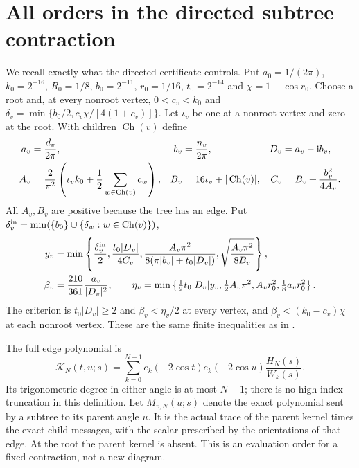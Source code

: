\section{All orders in the directed subtree contraction}\label{me:directed}
We recall exactly what the directed certificate controls. Put
$a_0=1/(2\pi)$, $k_0=2^{-16}$, $R_0=1/8$, $b_0=2^{-11}$,
$r_0=1/16$, $t_0=2^{-14}$ and $\chi=1-\cos r_0$.
Choose a root and, at every nonroot vertex, $0<c_v<k_0$ and
$\delta_v=\min\{b_0/2,c_v\chi/[4(1+c_v)]\}$. Let $\iota_v$ be
one at a nonroot vertex and zero at the root. With children
$\operatorname{Ch}(v)$ define
\begin{align}
 a_v&=\frac{d_v}{2\pi},& b_v&=\frac{n_v}{2\pi},&D_v&=a_v-\mathrm i b_v,
       \notag\\
 A_v&=\frac2{\pi^2}\left(\iota_vk_0+\frac12\sum_{w\in\operatorname{Ch}(v)}c_w\right),&
 B_v&=16\iota_v+|\operatorname{Ch}(v)|,&
 C_v&=B_v+\frac{b_v^2}{4A_v}.\label{me:directed-data}
\end{align}
All $A_v,B_v$ are positive because the tree has an edge. Put
$\delta_v^{\rm in}=\min(\{b_0\}\cup\{\delta_w:w\in\operatorname{Ch}(v)\})$,
\begin{align}
 y_v&=\min\left\{\frac{\delta_v^{\rm in}}2,
 \frac{t_0|D_v|}{4C_v},
 \frac{A_v\pi^2}{8(\pi|b_v|+t_0|D_v|)},
 \sqrt{\frac{A_v\pi^2}{8B_v}}\right\},\notag\\
 \beta_v&=\frac{210}{361}\frac{a_v}{|D_v|^2},\qquad
 \eta_v=\min\left\{\tfrac12t_0|D_v|y_v,
 \tfrac12 A_v\pi^2,A_vr_0^2,\tfrac18a_vr_0^2\right\}.
 \label{me:directed-losses}
\end{align}
The criterion is $t_0|D_v|\ge2$ and $\beta_v<\eta_v/2$ at every
vertex, and $\beta_v<(k_0-c_v)\chi$ at each nonroot vertex.
These are the same finite inequalities as in \cite{CircleTree}.

The full edge polynomial is
\begin{equation}\label{me:full-kernel}
 \mathscr K_N(t,u;s)=\sum_{k=0}^{N-1}
       e_k(-2\cos t)e_k(-2\cos u)\frac{H_N(s)}{W_k(s)}.
\end{equation}
Its trigonometric degree in either angle is at most $N-1$;
there is no high-index truncation in this definition. Let
$M_{v,N}(u;s)$ denote the exact polynomial sent by a subtree to
its parent angle $u$. It is the actual trace of the parent kernel
times the exact child messages, with the scalar prescribed by the orientations of that edge.
At the root the parent kernel is absent. This is an evaluation
order for a fixed contraction, not a new diagram.

